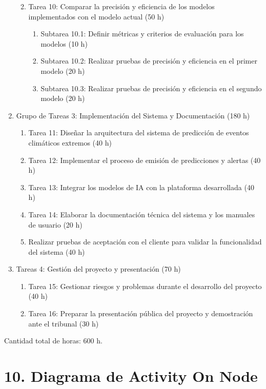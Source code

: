 \documentclass[
11pt, %
codirector, %
]{charter}
\begin{document}
\begin{enumerate}
\begin{enumerate}
\begin{enumerate}
	\end{enumerate}	
	\item Tarea 10: Comparar la precisión y eficiencia de los modelos implementados con el modelo actual (50 h)
	\begin{enumerate}
	\item Subtarea 10.1: Definir métricas y criterios de evaluación para los modelos (10 h)
	\item Subtarea 10.2: Realizar pruebas de precisión y eficiencia en el primer modelo (20 h)
	\item Subtarea 10.3: Realizar pruebas de precisión y eficiencia en el segundo modelo (20 h)
	\end{enumerate}
	\end{enumerate}
\item Grupo de Tareas 3: Implementación del Sistema y Documentación (180 h)
\begin{enumerate}
	\item Tarea 11: Diseñar la arquitectura del sistema de predicción de eventos climáticos extremos (40 h)
	\item Tarea 12: Implementar el proceso de emisión de predicciones y alertas (40 h)
	\item Tarea 13: Integrar los modelos de IA con la plataforma desarrollada (40 h)
	\item Tarea 14: Elaborar la documentación técnica del sistema y los manuales de usuario (20 h)
	\item Realizar pruebas de aceptación con el cliente para validar la funcionalidad del sistema (40 h)
	\end{enumerate}
\item Tareas 4: Gestión del proyecto y presentación (70 h)
\begin{enumerate}
	\item Tarea 15: Gestionar riesgos y problemas durante el desarrollo del proyecto (40 h)
	\item Tarea 16: Preparar la presentación pública del proyecto y demostración ante el tribunal (30 h)
	\end{enumerate}
\end{enumerate}

Cantidad total de horas: 600 h.

\section{10. Diagrama de Activity On Node}
\label{sec:AoN}
\end{document}
